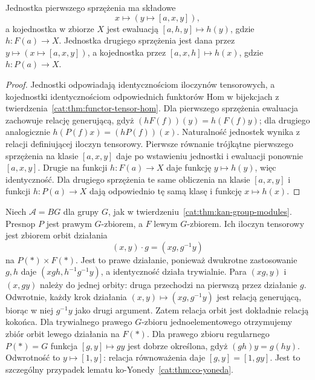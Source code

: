 \begin{wniosek}\label{cat:cor:tensor-adjunction-unit}
Jednostka pierwszego sprzężenia ma składowe
\[
 x\longmapsto (y\longmapsto[a,x,y]),
\]
a kojednostka w zbiorze $X$ jest ewaluacją $[a,h,y]\mapsto h(y)$, gdzie $h:F(a)\to X$. Jednostka drugiego sprzężenia jest dana przez $y\mapsto(x\mapsto[a,x,y])$, a kojednostka przez $[a,x,h]\mapsto h(x)$, gdzie $h:P(a)\to X$.
\end{wniosek}
\begin{proof}
Jednostki odpowiadają identycznościom iloczynów tensorowych, a kojednostki identycznościom odpowiednich funktorów Hom w bijekcjach z twierdzenia~\ref{cat:thm:functor-tensor-hom}. Dla pierwszego sprzężenia ewaluacja zachowuje relację generującą, gdyż $(hF(f))(y)=h(F(f)y)$; dla drugiego analogicznie $h(P(f)x)=(hP(f))(x)$. Naturalność jednostek wynika z relacji definiującej iloczyn tensorowy. Pierwsze równanie trójkątne pierwszego sprzężenia na klasie $[a,x,y]$ daje po wstawieniu jednostki i ewaluacji ponownie $[a,x,y]$. Drugie na funkcji $h:F(a)\to X$ daje funkcję $y\mapsto h(y)$, więc identyczność. Dla drugiego sprzężenia te same obliczenia na klasie $[a,x,y]$ i funkcji $h:P(a)\to X$ dają odpowiednio tę samą klasę i funkcję $x\mapsto h(x)$.
\end{proof}
\begin{przyklad}\label{cat:ex:functor-tensor-group}
Niech $\mathcal A=BG$ dla grupy $G$, jak w twierdzeniu~\ref{cat:thm:kan-group-modules}. Presnop $P$ jest prawym $G$-zbiorem, a $F$ lewym $G$-zbiorem. Ich iloczyn tensorowy jest zbiorem orbit działania
\[
 (x,y)\cdot g=(xg,g^{-1}y)
\]
na $P(*)\times F(*)$. Jest to prawe działanie, ponieważ dwukrotne zastosowanie $g,h$ daje $(xgh,h^{-1}g^{-1}y)$, a identyczność działa trywialnie. Para $(xg,y)$ i $(x,gy)$ należy do jednej orbity: druga przechodzi na pierwszą przez działanie $g$. Odwrotnie, każdy krok działania $(x,y)\mapsto(xg,g^{-1}y)$ jest relacją generującą, biorąc w niej $g^{-1}y$ jako drugi argument. Zatem relacja orbit jest dokładnie relacją kokońca. Dla trywialnego prawego $G$-zbioru jednoelementowego otrzymujemy zbiór orbit lewego działania na $F(*)$. Dla prawego zbioru regularnego $P(*)=G$ funkcja $[g,y]\mapsto gy$ jest dobrze określona, gdyż $(gh)y=g(hy)$. Odwrotność to $y\mapsto[1,y]$: relacja równoważenia daje $[g,y]=[1,gy]$. Jest to szczególny przypadek lematu ko-Yonedy~\ref{cat:thm:co-yoneda}.
\end{przyklad}

